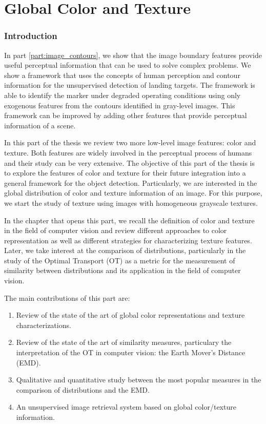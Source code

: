 \part{Global Color and Texture}\label{part:global_color_texture}%

\section*{Introduction}
In part \ref{part:image_contours}, we show that the image boundary features provide useful perceptual information that can be used to solve complex problems. We show a framework that uses the concepts of human perception and contour information for the unsupervised detection of landing targets. The framework is able to identify the marker under degraded operating conditions using only exogenous features from the contours identified in gray-level images. This framework can be improved by adding other features that provide perceptual information of a scene.

In this part of the thesis we review two more low-level image features: color and texture. Both features are widely involved in the perceptual process of humans and their study can be very extensive. The objective of this part of the thesis is to explore the features of color and texture for their future integration into a general framework for the object detection.
Particularly, we are interested in the global distribution of color and texture information of an image. For this purpose, we start the study of texture using images with homogeneous grayscale textures.

In the chapter that opens this part, we recall the definition of color and texture in the field of computer vision and review different approaches to color representation as well as different strategies for characterizing texture features. Later, we take interest at the comparison of distributions, particularly in the study of the Optimal Transport (OT) as a metric for the measurement of similarity between distributions and its application in the field of computer vision.


The main contributions of this part are:

\begin{enumerate}
	\item Review of the state of the art of global color representations and texture characterizations.
	\item Review of the state of the art of similarity measures, particulary the interpretation of the OT in computer vision: the Earth Mover's Distance (EMD).
	\item Qualitative and quantitative study between the most popular measures in the comparison of distributions and the EMD. 
	\item An unsupervised image retrieval system based on global color/texture information.
\end{enumerate}



